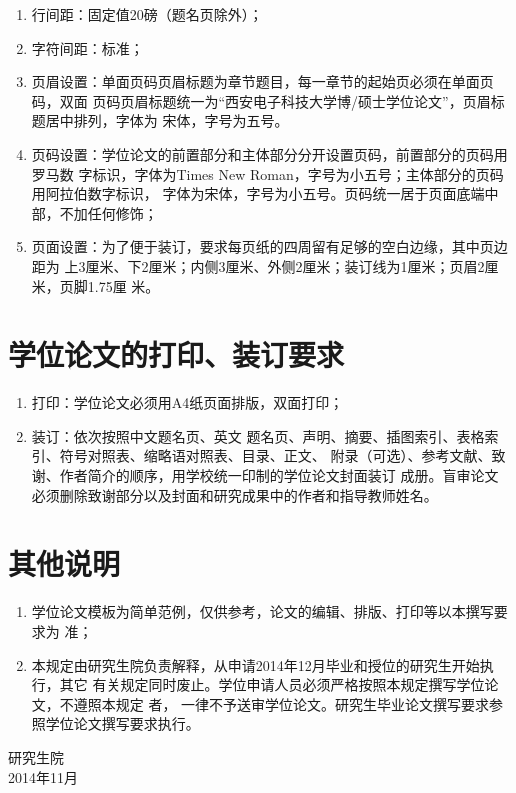 \begin{enumerate}
\item 行间距：固定值20磅（题名页除外）；
\item 字符间距：标准；
\item 页眉设置：单面页码页眉标题为章节题目，每一章节的起始页必须在单面页码，双面
  页码页眉标题统一为“西安电子科技大学博/硕士学位论文”，页眉标题居中排列，字体为
  宋体，字号为五号。
\item 页码设置：学位论文的前置部分和主体部分分开设置页码，前置部分的页码用罗马数
  字标识，字体为Times New Roman，字号为小五号；主体部分的页码用阿拉伯数字标识，
  字体为宋体，字号为小五号。页码统一居于页面底端中部，不加任何修饰；
\item 页面设置：为了便于装订，要求每页纸的四周留有足够的空白边缘，其中页边距为
  上3厘米、下2厘米；内侧3厘米、外侧2厘米；装订线为1厘米；页眉2厘米，页脚1.75厘
  米。
\end{enumerate}

\section{学位论文的打印、装订要求}

\begin{enumerate}
\item 打印：学位论文必须用A4纸页面排版，双面打印；
\item 装订：依次按照中文题名页、英文
  题名页、声明、摘要、插图索引、表格索引、符号对照表、缩略语对照表、目录、正文、
  附录（可选）、参考文献、致谢、作者简介的顺序，用学校统一印制的学位论文封面装订
  成册。盲审论文必须删除致谢部分以及封面和研究成果中的作者和指导教师姓名。
\end{enumerate}
\section{其他说明}

\begin{enumerate}
\item 学位论文模板为简单范例，仅供参考，论文的编辑、排版、打印等以本撰写要求为
  准；
\item 本规定由研究生院负责解释，从申请2014年12月毕业和授位的研究生开始执行，其它
  有关规定同时废止。学位申请人员必须严格按照本规定撰写学位论文，不遵照本规定
  者， 一律不予送审学位论文。研究生毕业论文撰写要求参照学位论文撰写要求执行。
\end{enumerate}

\begin{flushright}
  研究生院\\ 2014年11月
\end{flushright}

